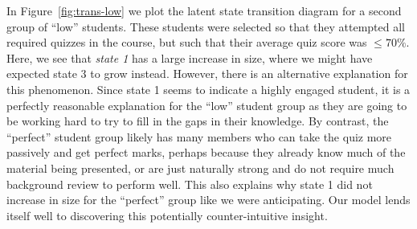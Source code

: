 In Figure~\ref{fig:trans-low} we plot the latent state transition diagram
for a second group of ``low'' students. These students were selected so
that they attempted all required quizzes in the course, but such that their
average quiz score was $\leq 70\%$. Here, we see that \emph{state 1} has a
large increase in size, where we might have expected state 3 to grow
instead.  However, there is an alternative explanation for this phenomenon.
Since state 1 seems to indicate a highly engaged student, it is a perfectly
reasonable explanation for the ``low'' student group as they are going to
be working hard to try to fill in the gaps in their knowledge. By contrast,
the ``perfect'' student group likely has many members who can take the quiz
more passively and get perfect marks, perhaps because they already know
much of the material being presented, or are just naturally strong and do
not require much background review to perform well. This also explains why
state 1 did not increase in size for the ``perfect'' group like we were
anticipating. Our model lends itself well to discovering this potentially
counter-intuitive insight.
